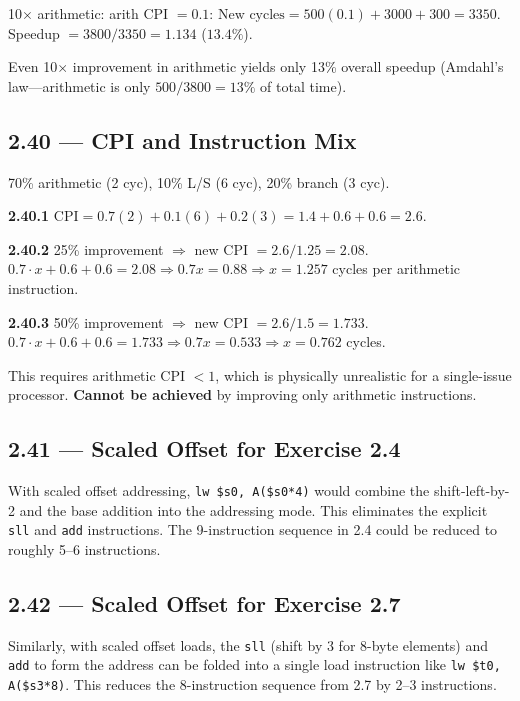 10$\times$ arithmetic: arith CPI $= 0.1$:
$\text{New cycles} = 500(0.1) + 3000 + 300 = 3350$.
Speedup $= 3800/3350 = 1.134$ ($13.4\%$).

Even 10$\times$ improvement in arithmetic yields only 13\% overall speedup
(Amdahl's law---arithmetic is only $500/3800 = 13\%$ of total time).

\subsection*{2.40 --- CPI and Instruction Mix}
\hypertarget{sol-2.40}{}

70\% arithmetic (2 cyc), 10\% L/S (6 cyc), 20\% branch (3 cyc).

\noindent\textbf{2.40.1}
$\text{CPI} = 0.7(2) + 0.1(6) + 0.2(3) = 1.4 + 0.6 + 0.6 = 2.6$.

\noindent\textbf{2.40.2}
25\% improvement $\Rightarrow$ new CPI $= 2.6/1.25 = 2.08$.
$0.7 \cdot x + 0.6 + 0.6 = 2.08 \Rightarrow 0.7x = 0.88
\Rightarrow x = 1.257$ cycles per arithmetic instruction.

\noindent\textbf{2.40.3}
50\% improvement $\Rightarrow$ new CPI $= 2.6/1.5 = 1.733$.
$0.7 \cdot x + 0.6 + 0.6 = 1.733 \Rightarrow 0.7x = 0.533
\Rightarrow x = 0.762$ cycles.

This requires arithmetic CPI $< 1$, which is physically unrealistic for
a single-issue processor. \textbf{Cannot be achieved} by improving only
arithmetic instructions.

\subsection*{2.41 --- Scaled Offset for Exercise 2.4}
\hypertarget{sol-2.41}{}

With scaled offset addressing, \texttt{lw \$s0, A(\$s0*4)} would combine
the shift-left-by-2 and the base addition into the addressing mode. This
eliminates the explicit \texttt{sll} and \texttt{add} instructions. The
9-instruction sequence in 2.4 could be reduced to roughly 5--6 instructions.

\subsection*{2.42 --- Scaled Offset for Exercise 2.7}
\hypertarget{sol-2.42}{}

Similarly, with scaled offset loads, the \texttt{sll} (shift by 3 for
8-byte elements) and \texttt{add} to form the address can be folded into a
single load instruction like \texttt{lw \$t0, A(\$s3*8)}. This reduces the
8-instruction sequence from 2.7 by 2--3 instructions.
